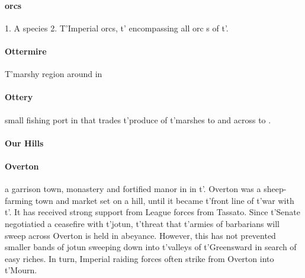 \paragraph{orcs} 1. A species 2. T'Imperial orcs, t'\allowbreak {} encompassing all orc s of t'\allowbreak {}.
\paragraph{Ottermire} T'marshy region around  in 
\paragraph{Ottery} small fishing port in  that trades t'\allowbreak produce of t'\allowbreak marshes to  and across  to .
\paragraph{Our Hills} 
\paragraph{Overton} a garrison town, monastery and fortified manor in  in t'\allowbreak {}. Overton was a sheep-farming town and market set on a hill, until it became t'\allowbreak front line of t'\allowbreak war with t'\allowbreak {}. It has received strong support from League forces from Tassato. Since t'\allowbreak Senate negotiatied a ceasefire with t'\allowbreak jotun, t'\allowbreak threat that t'\allowbreak armies of barbarians will sweep across Overton is held in abeyance. However, this has not prevented smaller bands of jotun sweeping down into t'\allowbreak valleys of t'\allowbreak Greensward in search of easy riches. In turn, Imperial raiding forces often strike from Overton into t'\allowbreak Mourn.
